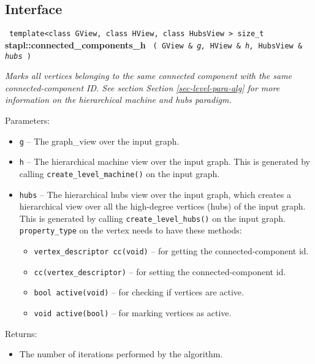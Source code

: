 \subsection{Interface} \label{sec-conn-comp-hmach-hubs-alg-inter}

\noindent
\texttt{%
template<class GView, class HView, class HubsView >
\newline
size\_t 
}
\newline
\textbf{stapl::connected\_components\_h}%
\newline
\texttt{%
(
GView \&
\textit{g,}%
HView \&
\textit{h,}%
HubsView \&
\textit{hubs}%
)     
}
\vspace{0.4cm}

\textit{
Marks all vertices belonging to the same connected component with the same 
connected-component ID.
See section
Section \ref{sec-level-para-alg}
for more information on the hierarchical machine and hubs paradigm.
}
\vspace{0.4cm}

Parameters:
\begin{itemize}
\item
\texttt{g} --
The graph\_view over the input graph.
\item
\texttt{h} --
The hierarchical machine view over the input graph. This is generated by calling
\texttt{create\_level\_machine()}%
 on the input graph.
\item
\texttt{hubs} --
The hierarchical hubs view over the input graph, which creates a hierarchical view over all the high-degree vertices (hubs) of the input graph. This is generated by calling 
\texttt{create\_level\_hubs()}%
 on the input graph. 
\texttt{property\_type} 
on the vertex needs to have these methods: 
\begin{itemize}
\item
\texttt{vertex\_descriptor cc(void)} --
for getting the connected-component id. 
\item
\texttt{cc(vertex\_descriptor)} --
for setting the connected-component id. 
\item
\texttt{bool active(void)} --
for checking if vertices are active. 
\item
\texttt{void active(bool)} --
for marking vertices as active.
\end{itemize}
\end{itemize}

Returns:
\begin{itemize}
\item
The number of iterations performed by the algorithm. 
\end{itemize}

